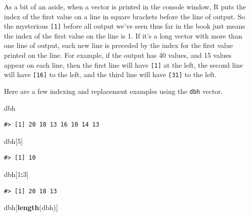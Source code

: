 \documentclass[
  11pt,
]{krantz}
\newenvironment{Shaded}{\begin{snugshade}}{\end{snugshade}}
\newcommand{\DecValTok}[1]{\textcolor[rgb]{0.00,0.00,0.81}{#1}}
\newcommand{\KeywordTok}[1]{\textcolor[rgb]{0.13,0.29,0.53}{\textbf{#1}}}
\newcommand{\NormalTok}[1]{#1}
\newcommand{\OperatorTok}[1]{\textcolor[rgb]{0.81,0.36,0.00}{\textbf{#1}}}
\theoremstyle{definition}
\theoremstyle{definition}
\theoremstyle{definition}
\theoremstyle{definition}
\theoremstyle{remark}
\begin{document}
As a bit of an aside, when a vector is printed in the console window, R puts the index of the first value on a line in square brackets before the line of output. So the mysterious \texttt{{[}1{]}} before all output we've seen thus far in the book just means the index of the first value on the line is 1. If it's a long vector with more than one line of output, each new line is preceded by the index for the first value printed on the line. For example, if the output has 40 values, and 15 values appear on each line, then the first line will have \texttt{{[}1{]}} at the left, the second line will have \texttt{{[}16{]}} to the left, and the third line will have \texttt{{[}31{]}} to the left.

Here are a few indexing and replacement examples using the \texttt{dbh} vector.

\begin{Shaded}
\begin{Highlighting}[]
\NormalTok{dbh}
\end{Highlighting}
\end{Shaded}

\begin{verbatim}
#> [1] 20 18 13 16 10 14 13
\end{verbatim}

\begin{Shaded}
\begin{Highlighting}[]
\NormalTok{dbh[}\DecValTok{5}\NormalTok{]}
\end{Highlighting}
\end{Shaded}

\begin{verbatim}
#> [1] 10
\end{verbatim}

\begin{Shaded}
\begin{Highlighting}[]
\NormalTok{dbh[}\DecValTok{1}\OperatorTok{:}\DecValTok{3}\NormalTok{]}
\end{Highlighting}
\end{Shaded}

\begin{verbatim}
#> [1] 20 18 13
\end{verbatim}

\begin{Shaded}
\begin{Highlighting}[]
\NormalTok{dbh[}\KeywordTok{length}\NormalTok{(dbh)]}
\end{Highlighting}
\end{Shaded}
\end{document}
